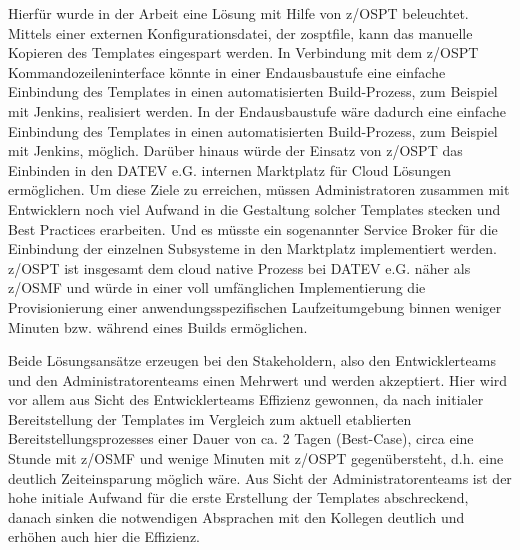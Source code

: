Hierfür wurde in der Arbeit eine Lösung mit Hilfe von z/OSPT beleuchtet.
Mittels einer externen Konfigurationsdatei, der \glqq zosptfile\grqq, kann das manuelle Kopieren des Templates eingespart werden.
In Verbindung mit dem z/OSPT Kommandozeileninterface könnte in einer Endausbaustufe eine einfache Einbindung des Templates in einen automatisierten Build-Prozess, zum Beispiel mit Jenkins, realisiert werden.
In der Endausbaustufe wäre dadurch eine einfache Einbindung des Templates in einen automatisierten Build-Prozess, zum Beispiel mit Jenkins, möglich.
Darüber hinaus würde der Einsatz von z/OSPT das Einbinden in den DATEV e.G. internen \glqq Marktplatz\grqq{} für Cloud Lösungen ermöglichen.
Um diese Ziele zu erreichen, müssen Administratoren zusammen mit Entwicklern noch viel Aufwand in die Gestaltung solcher Templates stecken und Best Practices erarbeiten.
Und es müsste ein sogenannter \glqq Service Broker\grqq{} für die Einbindung der einzelnen Subsysteme in den \glqq Marktplatz\grqq{} implementiert werden.
z/OSPT ist insgesamt dem cloud native Prozess bei DATEV e.G. näher als z/OSMF und würde in einer voll umfänglichen Implementierung die Provisionierung einer anwendungsspezifischen Laufzeitumgebung binnen weniger Minuten bzw. während eines Builds ermöglichen.

Beide Lösungsansätze erzeugen bei den Stakeholdern, also den Entwicklerteams und den Administratorenteams einen Mehrwert und werden akzeptiert.
Hier wird vor allem aus Sicht des Entwicklerteams Effizienz gewonnen, da nach initialer Bereitstellung der Templates im Vergleich zum aktuell etablierten Bereitstellungsprozesses einer Dauer von ca. 2 Tagen (\glqq Best-Case\grqq), circa eine Stunde mit z/OSMF und wenige Minuten mit z/OSPT gegenübersteht, d.h. eine deutlich Zeiteinsparung möglich wäre.
Aus Sicht der Administratorenteams ist der hohe initiale Aufwand für die erste Erstellung der Templates abschreckend, danach sinken die notwendigen Absprachen mit den Kollegen deutlich und erhöhen auch hier die Effizienz.

